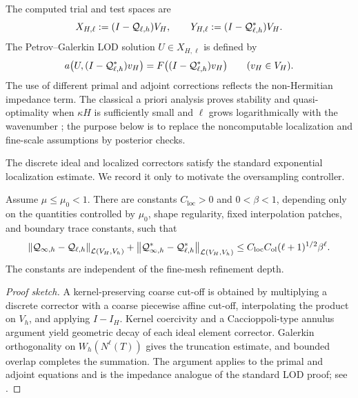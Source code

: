 The computed trial and test spaces are
\begin{equation}
\label{eq:computed-spaces}
  X_{H,\ell}:=(I-\mathcal Q_{\ell,h})V_H,
  \qquad
  Y_{H,\ell}:=(I-\mathcal Q_{\ell,h}^*)V_H.
\end{equation}
The Petrov--Galerkin LOD solution $U\in X_{H,\ell}$ is defined by
\begin{equation}
\label{eq:PG}
  a\bigl(U,(I-\mathcal Q_{\ell,h}^*)v_H\bigr)
  =F\bigl((I-\mathcal Q_{\ell,h}^*)v_H\bigr)
  \qquad(v_H\in V_H).
\end{equation}
The use of different primal and adjoint corrections reflects the
non-Hermitian impedance term.  The classical a priori analysis proves
stability and quasi-optimality when $\kappa H$ is sufficiently small and
$\ell$ grows logarithmically with the wavenumber
\cite{Peterseim2017}; the purpose below is to replace the noncomputable
localization and fine-scale assumptions by posterior checks.

The discrete ideal and localized correctors satisfy the standard
exponential localization estimate.  We record it only to motivate the
oversampling controller.

\begin{theorem}
\label{thm:localization}
Assume $\mu\leq\mu_0<1$.  There are constants
$C_{\mathrm{loc}}>0$ and $0<\beta<1$, depending only on the quantities
controlled by $\mu_0$, shape regularity, fixed interpolation patches, and
boundary trace constants, such that
\begin{equation}
\label{eq:localization}
 \begin{aligned}
  \left\lVert \mathcal Q_{\infty,h}-\mathcal Q_{\ell,h}\right\rVert_{\mathcal L(V_H,V_h)}
  +\left\lVert \mathcal Q_{\infty,h}^*-\mathcal Q_{\ell,h}^*\right\rVert_{\mathcal L(V_H,V_h)}
  \leq
  C_{\mathrm{loc}}C_{\mathrm{ol}}(\ell+1)^{1/2}\beta^\ell.
 \end{aligned}
\end{equation}
The constants are independent of the fine-mesh refinement depth.
\end{theorem}

\begin{proof}[Proof sketch]
A kernel-preserving coarse cut-off is obtained by multiplying a discrete
corrector with a coarse piecewise affine cut-off, interpolating the product
on $V_h$, and applying $I-I_H$.  Kernel coercivity and a Caccioppoli-type
annulus argument yield geometric decay of each ideal element corrector.
Galerkin orthogonality on $W_h(N^\ell(T))$ gives the truncation estimate,
and bounded overlap completes the summation.  The argument applies to the
primal and adjoint equations and is the impedance analogue of the standard
LOD proof; see \cite{MalqvistPeterseim2014,Peterseim2017,
MalqvistPeterseim2020}.
\end{proof}


